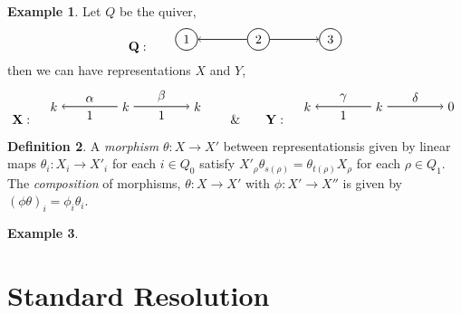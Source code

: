 \documentclass[11.5pt, twoside, a4paper, titlepage]{report}
\theoremstyle{definition}
\newtheorem{mydef}{Definition}[section]
\newtheorem{eg}[mydef]{Example}
\theoremstyle{plain}
\begin{document}
\begin{eg}
Let $Q$ be the quiver, 
\begin{equation*}
\mathbf{Q}: \qquad
\begin{tikzpicture}[->,-latex, auto, every path/.style={->, semithick}, main node/.style={draw, circle}]
\node	[main node]		(1) at (0,0)		{1};
\node [main node]		(2) at (2,0)		{2};
\node [main node]		(3) at (4,0)		{3};

\draw (2) edge (1);
\draw (2) edge (3);
\end{tikzpicture}
\end{equation*}
then we can have representations $X$ and $Y$, 
\begin{equation*}
\mathbf{X}: \quad
\begin{tikzpicture}[->,-latex, auto, every path/.style={->, semithick}, main node/.style={draw, circle}]
\node	[]		(1) at (0,0)		{$k$};
\node []		(2) at (2,0)		{$k$};
\node []		(3) at (4,0)		{$k$};

\draw (2) edge node [auto, swap] {$\alpha$} node [auto] {1} (1);
\draw (2) edge node [auto] {$\beta$} node [auto, swap] {1} (3);
\end{tikzpicture}
\qquad \& \qquad
\mathbf{Y}: \quad
\begin{tikzpicture}[->,-latex, auto, every path/.style={->, semithick}, main node/.style={draw, circle}]
\node	[]		(1) at (0,0)		{$k$};
\node []		(2) at (2,0)		{$k$};
\node []		(3) at (4,0)		{$0$};

\draw (2) edge node [auto, swap] {$\gamma$} node [auto] {1} (1);
\draw (2) edge node [auto] {$\delta$} (3);
\end{tikzpicture}
\end{equation*}
\end{eg}

\begin{mydef}
A \emph{morphism} $\theta: X \to X'$ between representationsis given by linear maps $\theta_i:X_i \to X'_i$ for each $i\in Q_0$ satisfy $X'_{\rho}\theta _{s(\rho)} = \theta_{t(\rho)}X_{\rho}$ for each $\rho \in Q_1$. The \emph{composition} of morphisms, $\theta: X \to X'$ with $\phi: X' \to X''$ is given by $(\phi \theta)_i=\phi_i \theta_i$.
\end{mydef}

\begin{eg}
\end{eg}





\section{Standard Resolution}
\end{document}
